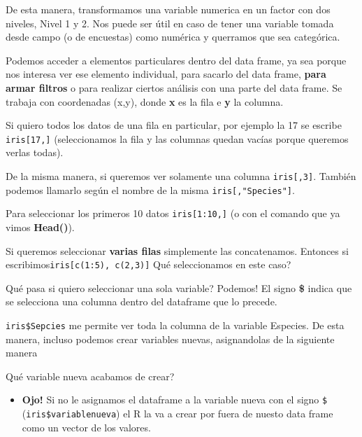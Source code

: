 \documentclass[
]{book}
\newenvironment{Shaded}{\begin{snugshade}}{\end{snugshade}}
\newcommand{\NormalTok}[1]{#1}
\newcommand{\OtherTok}[1]{\textcolor[rgb]{0.56,0.35,0.01}{#1}}
\newcommand{\SpecialCharTok}[1]{\textcolor[rgb]{0.00,0.00,0.00}{#1}}
\providecommand{\tightlist}{%
  \setlength{\itemsep}{0pt}\setlength{\parskip}{0pt}}
\begin{document}
De esta manera, transformamos una variable numerica en un factor con dos niveles, Nivel 1 y 2. Nos puede ser útil en caso de tener una variable tomada desde campo (o de encuestas) como numérica y querramos que sea categórica.

Podemos acceder a elementos particulares dentro del data frame, ya sea porque nos interesa ver ese elemento individual, para sacarlo del data frame, \textbf{para armar filtros} o para realizar ciertos análisis con una parte del data frame. Se trabaja con coordenadas (x,y), donde \textbf{x} es la fila e \textbf{y} la columna.

Si quiero todos los datos de una fila en particular, por ejemplo la 17 se escribe \texttt{iris{[}17,{]}} (seleccionamos la fila y las columnas quedan vacías porque queremos verlas todas).

De la misma manera, si queremos ver solamente una columna \texttt{iris{[},3{]}}. También podemos llamarlo según el nombre de la misma \texttt{iris{[},"Species"{]}}.

Para seleccionar los primeros 10 datos \texttt{iris{[}1:10,{]}} (o con el comando que ya vimos \textbf{Head()}).

Si queremos seleccionar \textbf{varias filas} simplemente las concatenamos. Entonces si escribimos\texttt{iris{[}c(1:5),\ c(2,3){]}} Qué seleccionamos en este caso?

Qué pasa si quiero seleccionar una sola variable? Podemos! El signo \textbf{\$} indica que se selecciona una columna dentro del dataframe que lo precede.

\texttt{iris\$Sepcies} me permite ver toda la columna de la variable Especies. De esta manera, incluso podemos crear variables nuevas, asignandolas de la siguiente manera

\begin{Shaded}
\end{Shaded}

Qué variable nueva acabamos de crear?

\begin{itemize}
\tightlist
\item
  \textbf{Ojo!} Si no le asignamos el dataframe a la variable nueva con el signo \texttt{\$} (\texttt{iris\$variablenueva}) el R la va a crear por fuera de nuesto data frame como un vector de los valores.
\end{itemize}
\end{document}
